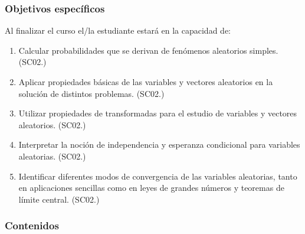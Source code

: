 \begin{refsection}
\subsubsection*{Objetivos específicos}

Al finalizar el curso el/la estudiante estará en la capacidad de:

\begin{enumerate}
\item Calcular probabilidades que se derivan de fenómenos aleatorios simples. (SC02.)
\item Aplicar propiedades básicas de las variables y vectores aleatorios en la solución de distintos problemas. (SC02.)
\item Utilizar propiedades de transformadas para el estudio de variables y vectores aleatorios. (SC02.)
\item Interpretar la noción de independencia y esperanza condicional para variables aleatorias. (SC02.)
\item Identificar diferentes modos de convergencia de las variables aleatorias, tanto en aplicaciones sencillas como en leyes de grandes números y teoremas de límite central. (SC02.)
\end{enumerate}

\subsubsection*{Contenidos}


\end{refsection}
